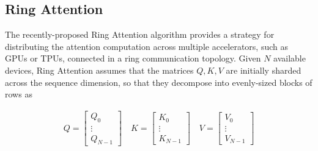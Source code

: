 \subsection{Ring Attention}

The recently-proposed Ring Attention algorithm \cite{liu2023ring} provides a strategy for distributing the attention computation across multiple accelerators, such as GPUs or TPUs, connected in a ring communication topology. Given $N$ available devices, Ring Attention assumes that the matrices $Q, K, V$ are initially sharded across the sequence dimension, so that they decompose into evenly-sized blocks of rows as

\begin{align*}
    Q = \begin{bmatrix}
        Q_0 \\
        \vdots \\
        Q_{N - 1}
    \end{bmatrix} \quad K = \begin{bmatrix}
        K_0 \\
        \vdots \\
        K_{N - 1}
    \end{bmatrix} \quad V = \begin{bmatrix}
        V_0 \\
        \vdots \\
        V_{N - 1}
    \end{bmatrix}
\end{align*}

